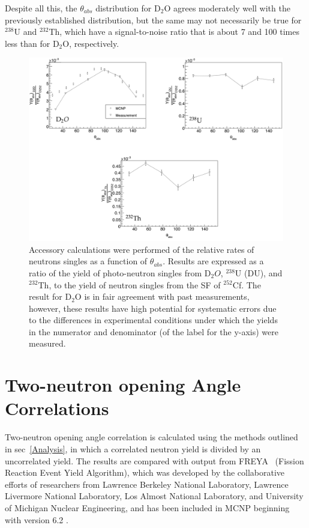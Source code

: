 Despite all this, the $\theta_{abs}$ distribution for D$_{2}$O agrees moderately well with the previously established distribution, but the same may not necessarily be true for $^{238}$U and $^{232}$Th, which have a signal-to-noise ratio that is about 7 and 100 times less than for D$_{2}$O, respectively.

\begin{figure}
    \includegraphics[width = 1\textwidth]{Content/Results/Singles.png}
    \caption{Accessory calculations were performed of the relative rates of neutrons singles as a function of $\theta_{abs}$. 
    Results are expressed as a ratio of the yield of photo-neutron singles from D$_{2}O$, $^{238}$U (DU), and $^{232}$Th, to the yield of neutron singles from the SF of $^{252}$Cf.
   The result for D$_{2}$O is in fair agreement with past measurements, however, these results have high potential for systematic errors due to the differences in experimental conditions under which the yields in the numerator and denominator (of the label for the y-axis) were measured.
       }
    \label{fig:Singles}
\end{figure}

\FloatBarrier
\section{Two-neutron opening Angle Correlations}
Two-neutron opening angle correlation is calculated using the methods outlined in sec~\ref{Analysis}, in which a correlated neutron yield is divided by an uncorrelated yield.
The results are compared with output from FREYA~\cite{FREYA} (Fission Reaction Event Yield Algorithm), which was developed by the collaborative efforts of researchers from Lawrence Berkeley National Laboratory,  Lawrence Livermore National Laboratory, Los Almost National Laboratory, and University of Michigan Nuclear Engineering, and has been included in MCNP beginning with version 6.2 .
 
